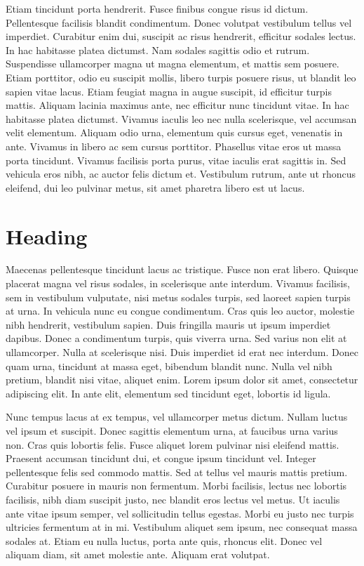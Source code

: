 \documentclass[12pt,a4paper,twoside, twocolumn]{article}
\begin{document}
Etiam tincidunt porta hendrerit. Fusce finibus congue risus id dictum. Pellentesque facilisis blandit condimentum. Donec volutpat vestibulum tellus vel imperdiet. Curabitur enim dui, suscipit ac risus hendrerit, efficitur sodales lectus. In hac habitasse platea dictumst. Nam sodales sagittis odio et rutrum.
Suspendisse ullamcorper magna ut magna elementum, et mattis sem posuere. Etiam porttitor, odio eu suscipit mollis, libero turpis posuere risus, ut blandit leo sapien vitae lacus. Etiam feugiat magna in augue suscipit, id efficitur turpis mattis. Aliquam lacinia maximus ante, nec efficitur nunc tincidunt vitae. In hac habitasse platea dictumst. Vivamus iaculis leo nec nulla scelerisque, vel accumsan velit elementum. Aliquam odio urna, elementum quis cursus eget, venenatis in ante. Vivamus in libero ac sem cursus porttitor. Phasellus vitae eros ut massa porta tincidunt. Vivamus facilisis porta purus, vitae iaculis erat sagittis in. Sed vehicula eros nibh, ac auctor felis dictum et. Vestibulum rutrum, ante ut rhoncus eleifend, dui leo pulvinar metus, sit amet pharetra libero est ut lacus. 

\section{Heading}
Maecenas pellentesque tincidunt lacus ac tristique. Fusce non erat libero. Quisque placerat magna vel risus sodales, in scelerisque ante interdum. Vivamus facilisis, sem in vestibulum vulputate, nisi metus sodales turpis, sed laoreet sapien turpis at urna. In vehicula nunc eu congue condimentum. Cras quis leo auctor, molestie nibh hendrerit, vestibulum sapien. Duis fringilla mauris ut ipsum imperdiet dapibus. Donec a condimentum turpis, quis viverra urna. Sed varius non elit at ullamcorper. Nulla at scelerisque nisi. Duis imperdiet id erat nec interdum. Donec quam urna, tincidunt at massa eget, bibendum blandit nunc. Nulla vel nibh pretium, blandit nisi vitae, aliquet enim. Lorem ipsum dolor sit amet, consectetur adipiscing elit. In ante elit, elementum sed tincidunt eget, lobortis id ligula.

Nunc tempus lacus at ex tempus, vel ullamcorper metus dictum. Nullam luctus vel ipsum et suscipit. Donec sagittis elementum urna, at faucibus urna varius non. Cras quis lobortis felis. Fusce aliquet lorem pulvinar nisi eleifend mattis. Praesent accumsan tincidunt dui, et congue ipsum tincidunt vel. Integer pellentesque felis sed commodo mattis. Sed at tellus vel mauris mattis pretium. Curabitur posuere in mauris non fermentum. Morbi facilisis, lectus nec lobortis facilisis, nibh diam suscipit justo, nec blandit eros lectus vel metus. Ut iaculis ante vitae ipsum semper, vel sollicitudin tellus egestas. Morbi eu justo nec turpis ultricies fermentum at in mi. Vestibulum aliquet sem ipsum, nec consequat massa sodales at. Etiam eu nulla luctus, porta ante quis, rhoncus elit. Donec vel aliquam diam, sit amet molestie ante. Aliquam erat volutpat.
\end{document}
